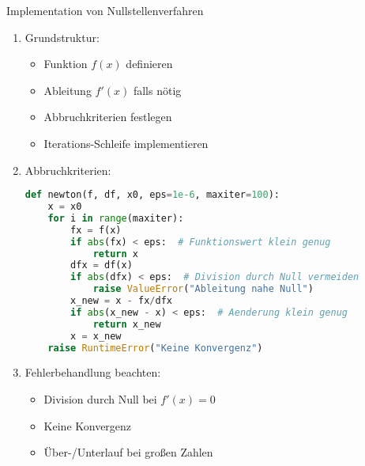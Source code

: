 \begin{KR}{Implementation von Nullstellenverfahren}
\begin{enumerate}
    \item Grundstruktur:
    \begin{itemize}
        \item Funktion $f(x)$ definieren
        \item Ableitung $f'(x)$ falls nötig
        \item Abbruchkriterien festlegen
        \item Iterations-Schleife implementieren
    \end{itemize}
    
    \item Abbruchkriterien:
    \begin{lstlisting}[language=Python, style=base]
def newton(f, df, x0, eps=1e-6, maxiter=100):
    x = x0
    for i in range(maxiter):
        fx = f(x)
        if abs(fx) < eps:  # Funktionswert klein genug
            return x
        dfx = df(x)
        if abs(dfx) < eps:  # Division durch Null vermeiden
            raise ValueError("Ableitung nahe Null")
        x_new = x - fx/dfx
        if abs(x_new - x) < eps:  # Aenderung klein genug
            return x_new
        x = x_new
    raise RuntimeError("Keine Konvergenz")
    \end{lstlisting}
    
    \item Fehlerbehandlung beachten:
    \begin{itemize}
        \item Division durch Null bei $f'(x) = 0$
        \item Keine Konvergenz
        \item Über-/Unterlauf bei großen Zahlen
    \end{itemize}
\end{enumerate}
\end{KR}